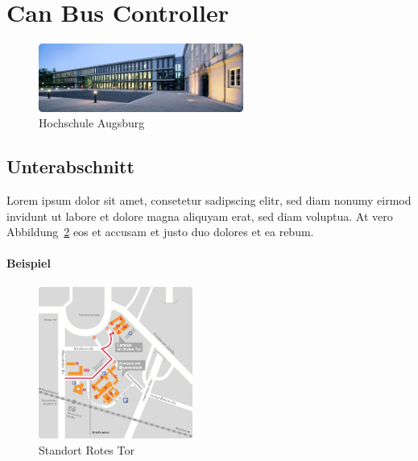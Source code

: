 \section{Can Bus Controller}
\label{sec:Can_Bus_Controller}


\begin{figure}
  \begin{center}
    \includegraphics[width=0.6\textwidth]{./images/hochschule.jpg}
  \end{center}
  \vspace{-5pt}
  \caption[Hochschule Augsburg]{Hochschule Augsburg \cite{HSA.2013}} %
  \label{fig:hochschule}
  \vspace{-5pt}
\end{figure}

\subsection{Unterabschnitt}
\label{subsec:SoTA:first:Unterabschnitt}

Lorem ipsum dolor sit amet, consetetur sadipscing elitr, sed diam nonumy eirmod  invidunt ut labore et dolore magna aliquyam erat, sed diam voluptua. At vero Abbildung~\ref{fig:standort_rotes_tor_anfahrt_klm_bau} eos et accusam et justo duo dolores et ea rebum.

\paragraph*{Beispiel}

\begin{figure}
  \vspace{-20pt}
  \begin{center}
    \includegraphics[width=0.45\textwidth]{./images/standort_rotes_tor_anfahrt_klm_bau.png}
  \end{center}
  \vspace{-20pt}
  \caption[Standort Rotes Tor]{Standort Rotes Tor \cite{HSA.2013}}
  \label{fig:standort_rotes_tor_anfahrt_klm_bau}
  \vspace{-10pt}
\end{figure}

